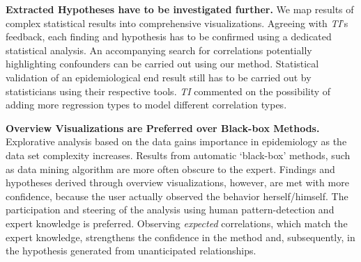 \documentclass[journal]{style/vgtc} 			          %
\newcommand{\com}[1]{\textcolor{orange}{\uline{#1}}}
\begin{document}
\textbf{Extracted Hypotheses have to be investigated further.}
We map results of complex statistical results into comprehensive visualizations.
Agreeing with \emph{TI}'s feedback, each finding and hypothesis has to be confirmed using a dedicated statistical analysis.
An accompanying search for correlations potentially highlighting confounders can be carried out using our method.
Statistical validation of an epidemiological end result still has to be carried out by statisticians using their respective tools.
\emph{TI} commented on the possibility of adding more regression types to model different correlation types.%

\textbf{Overview Visualizations are Preferred over Black-box Methods.}
Explorative analysis based on the data gains importance in epidemiology as the data set complexity increases.
Results from automatic `black-box' methods, such as data mining algorithm are more often obscure to the expert.
Findings and hypotheses derived through overview visualizations, however, are met with more confidence, because the user actually observed the behavior herself/himself.
The participation and steering of the analysis using human pattern-detection and expert knowledge is preferred.
Observing \emph{expected} correlations, which match the expert knowledge, strengthens the confidence in the method and, subsequently, in the hypothesis generated from unanticipated relationships.
\end{document}
